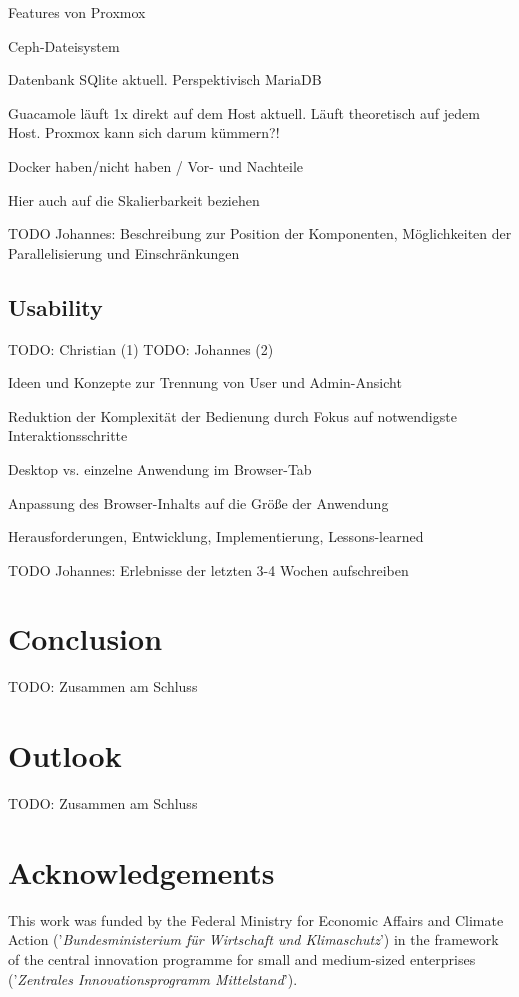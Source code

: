 \documentclass[runningheads]{llncs}
\begin{document}
Features von Proxmox

Ceph-Dateisystem

Datenbank SQlite aktuell. Perspektivisch MariaDB

Guacamole läuft 1x direkt auf dem Host aktuell. Läuft theoretisch auf jedem Host. Proxmox kann sich darum kümmern?!

Docker haben/nicht haben / Vor- und Nachteile

Hier auch auf die Skalierbarkeit beziehen

TODO Johannes: Beschreibung zur Position der Komponenten, Möglichkeiten der Parallelisierung und Einschränkungen 

\subsection{Usability}

TODO: Christian (1)
TODO: Johannes (2)

Ideen und Konzepte zur Trennung von User und Admin-Ansicht

Reduktion der Komplexität der Bedienung durch Fokus auf notwendigste Interaktionsschritte

Desktop vs. einzelne Anwendung im Browser-Tab

Anpassung des Browser-Inhalts auf die Größe der Anwendung

Herausforderungen, Entwicklung, Implementierung, Lessons-learned

TODO Johannes: Erlebnisse der letzten 3-4 Wochen aufschreiben



\section{Conclusion}

TODO: Zusammen am Schluss

\section{Outlook}

TODO: Zusammen am Schluss

\section*{Acknowledgements}

This work was funded by the Federal Ministry for Economic Affairs and Climate Action
('\textsl{Bundesministerium f\"ur Wirtschaft und Klimaschutz}')
in the framework of the central innovation programme
for small and medium-sized enterprises
('\textsl{Zentrales Innovationsprogramm Mittelstand}').
\end{document}
